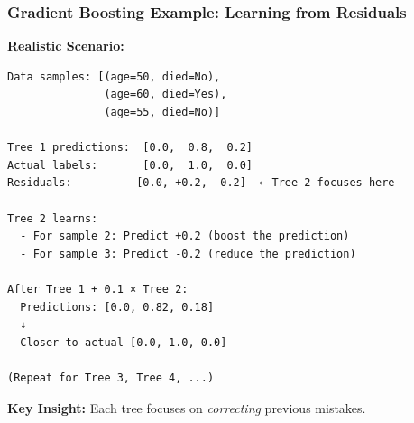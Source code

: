 \documentclass{beamer}
\begin{document}
\begin{frame}[fragile]
\frametitle{Gradient Boosting Example: Learning from Residuals}

\textbf{Realistic Scenario:}

\vspace{0.2cm}
{\small
\begin{lstlisting}
Data samples: [(age=50, died=No),
               (age=60, died=Yes),
               (age=55, died=No)]

Tree 1 predictions:  [0.0,  0.8,  0.2]
Actual labels:       [0.0,  1.0,  0.0]
Residuals:          [0.0, +0.2, -0.2]  ← Tree 2 focuses here

Tree 2 learns:
  - For sample 2: Predict +0.2 (boost the prediction)
  - For sample 3: Predict -0.2 (reduce the prediction)

After Tree 1 + 0.1 × Tree 2:
  Predictions: [0.0, 0.82, 0.18]
  ↓
  Closer to actual [0.0, 1.0, 0.0]

(Repeat for Tree 3, Tree 4, ...)
\end{lstlisting}
}

\vspace{0.2cm}
\textbf{Key Insight:} Each tree focuses on \textit{correcting} previous mistakes.

\end{frame}
\end{document}
